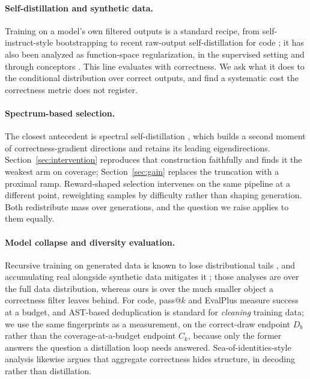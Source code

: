 \documentclass{article}
\begin{document}
\paragraph{Self-distillation and synthetic data.} Training on a model's own filtered outputs is a standard recipe, from self-instruct-style bootstrapping \citep{wang2023selfinstruct} to recent raw-output self-distillation for code \citep{zhang2026ssd}; it has also been analyzed as function-space regularization, in the supervised setting \citep{mobahi2020selfdistillation} and through conceptors \citep{postmus2024conceptors}. This line evaluates with correctness. We ask what it does to the conditional distribution over correct outputs, and find a systematic cost the correctness metric does not register.

\paragraph{Spectrum-based selection.} The closest antecedent is spectral self-distillation \citep{hao2026spd}, which builds a second moment of correctness-gradient directions and retains its leading eigendirections. Section~\ref{sec:intervention} reproduces that construction faithfully and finds it the weakest arm on coverage; Section~\ref{sec:gain} replaces the truncation with a proximal ramp. Reward-shaped selection \citep{hu2026rewardingrare} intervenes on the same pipeline at a different point, reweighting samples by difficulty rather than shaping generation. Both redistribute mass over generations, and the question we raise applies to them equally.

\paragraph{Model collapse and diversity evaluation.} Recursive training on generated data is known to lose distributional tails \citep{shumailov2024collapse}, and accumulating real alongside synthetic data mitigates it \citep{gerstgrasser2024accumulating}; those analyses are over the full data distribution, whereas ours is over the much smaller object a correctness filter leaves behind. For code, pass@$k$ \citep{chen2021humaneval} and EvalPlus \citep{liu2023evalplus} measure success at a budget, and AST-based deduplication is standard for \emph{cleaning} training data; we use the same fingerprints as a measurement, on the correct-draw endpoint $D_b$ rather than the coverage-at-a-budget endpoint $C_k$, because only the former answers the question a distillation loop needs answered. Sea-of-identities-style analysis \citep{qiu2024sea} likewise argues that aggregate correctness hides structure, in decoding rather than distillation.
\end{document}
